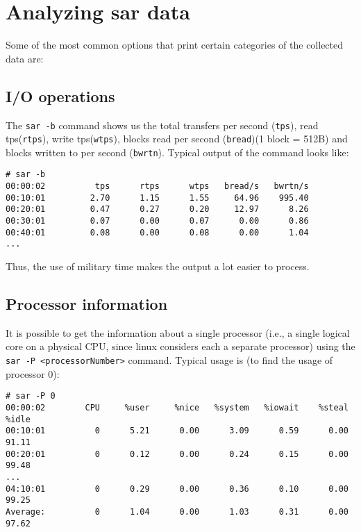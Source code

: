 	\section{Analyzing sar data}
Some of the most common options that print certain categories of the collected data are:

\subsection{I/O operations}	
The \verb|sar -b| command shows us the total transfers per second (\verb|tps|), read tps(\verb|rtps|), write tps(\verb|wtps|), blocks read per second (\verb|bread|)(1 block = 512B) and blocks written to per second (\verb|bwrtn|). Typical output of the command looks like:

\vspace{-15pt}
\begin{verbatim}
# sar -b
00:00:02          tps      rtps      wtps   bread/s   bwrtn/s
00:10:01         2.70      1.15      1.55     64.96    995.40
00:20:01         0.47      0.27      0.20     12.97      8.26
00:30:01         0.07      0.00      0.07      0.00      0.86
00:40:01         0.08      0.00      0.08      0.00      1.04
...
\end{verbatim}
\vspace{-10pt}	

\noindent
Thus, the use of military time makes the output a lot easier to process. 

\subsection{Processor information}
It is possible to get the information about a single processor (i.e., a single logical core on a physical CPU, since linux considers each a separate processor) using the \verb|sar -P <processorNumber>| command. Typical usage is (to find the usage of processor 0):

\vspace{-15pt}
\begin{verbatim}
# sar -P 0
00:00:02        CPU     %user     %nice   %system   %iowait    %steal     %idle
00:10:01          0      5.21      0.00      3.09      0.59      0.00     91.11
00:20:01          0      0.12      0.00      0.24      0.15      0.00     99.48
...
04:10:01          0      0.29      0.00      0.36      0.10      0.00     99.25
Average:          0      1.04      0.00      1.03      0.31      0.00     97.62
\end{verbatim}
\vspace{-10pt}	

